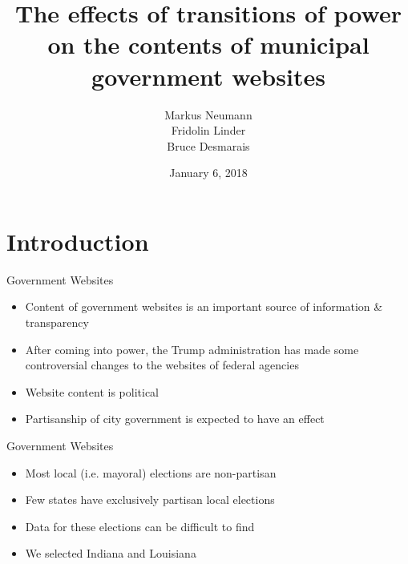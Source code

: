 \documentclass[12pt]{beamer}
\title[]{The effects of transitions of power on the contents of
	municipal government websites}
\author{Markus Neumann \\ Fridolin Linder \\ Bruce Desmarais}
\institute{The Pennsylvania State University}
\date{January 6, 2018}
\begin{document}
\section{Introduction}
\begin{frame}
\titlepage
\end{frame}


\begin{frame}{Government Websites}
\linespread{1.5}
{\large
	\begin{itemize}
		\item Content of government websites is an important source of information \& transparency
		\item After coming into power, the Trump administration  has made some controversial changes to the websites of federal agencies
		\item Website content is political
		\item Partisanship of city government is expected to have an effect
	\end{itemize}
	
}
\end{frame}

\begin{frame}{Government Websites}
\linespread{1.5}
{\large
	\begin{itemize}
		\item Most local (i.e. mayoral) elections are non-partisan
		\item Few states have exclusively partisan local elections
		\item Data for these elections can be difficult to find
		\item We selected Indiana and Louisiana
	\end{itemize}
	
	}
\end{frame}
\end{document}
